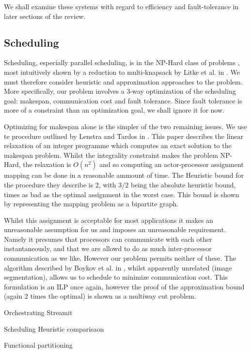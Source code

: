 We shall examine these systems with regard to efficiency and fault-tolerance  in later sections of the review.

\subsection*{Scheduling}

Scheduling, especially parallel scheduling, is in the NP-Hard class of problems \cite{len87, kha94}, most intuitively shown by a reduction to multi-knapsack by Litke et al. in \cite{lit07}.
We must therefore consider heuristic and approximation approaches to the problem.
More specifically, our problem involves a 3-way optimization of the scheduling goal: makespan, communication cost and fault tolerance.
Since fault tolerance is more of a constraint than an optimization goal, we shall ignore it for now.

Optimizing for makespan alone is the simpler of the two remaining issues.
We use te procedure outlined by Lenstra and Tardos in \cite{len87}.
This paper describes the linear relaxation of an integer programme which computes an exact solution to the makespan problem.
Whilst the integrality constraint makes the problem NP-Hard, the relaxation is $O(n^2)$ and so computing an actor-processor assignment mapping can be done in a reasonable ammount of time.
The Heuristic bound for the procedure they describe is 2, with $3/2$ being the absolute heuristic bound, times as bad as the optimal assignment in the worst case.
This bound is shown by representing the mapping problem as a bipartite graph.

Whilst this assignment is acceptable for most applications it makes an unreasonable assumption for us and imposes an unreasonable requirement.
Namely it presumes that processors can communicate with each other instantaneously, and that we are allowd to do as much inter-processor communication as we like.
However our problem permits neither of these.
The algorithm described by Boykov et al. in \cite{boy01}, whilst apparently unrelated (image segmentation), allows us to schedule to minimize communication cost.
This formulation is an ILP once again, however the proof of the approximation bound (again 2 times the optimal) is shown as a multiway cut problem.



Orchestrating Streamit \cite{mal08}

Scheduling Heuristic comparisaon \cite{Kha94}

Functional partitioning \cite{li10}

